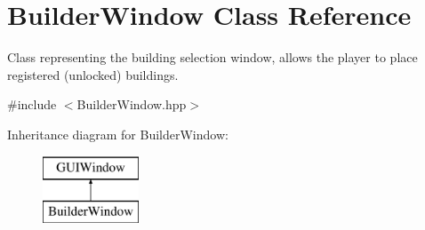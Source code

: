 \hypertarget{class_builder_window}{}\section{Builder\+Window Class Reference}
\label{class_builder_window}


Class representing the building selection window, allows the player to place registered (unlocked) buildings.  




{\ttfamily \#include $<$Builder\+Window.\+hpp$>$}

Inheritance diagram for Builder\+Window\+:\begin{figure}[H]
\begin{center}
\leavevmode
\includegraphics[height=2.000000cm]{class_builder_window}
\end{center}
\end{figure}
